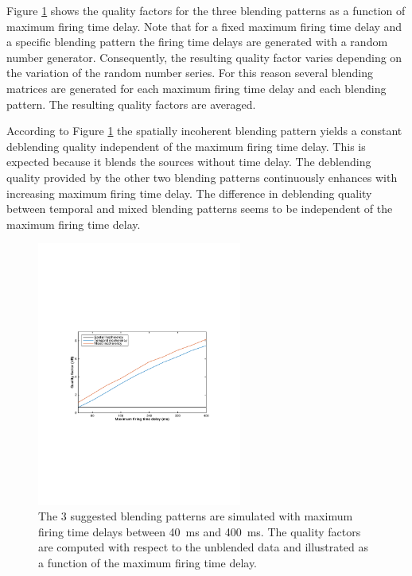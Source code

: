 Figure \ref{fig:Ch-Results-QualityFactors} shows the quality factors for the three blending patterns as a function of maximum firing time delay. Note that for a fixed maximum firing time delay and a specific blending pattern the firing time delays are generated with a random number generator. Consequently, the resulting quality factor varies depending on the variation of the random number series. For this reason several blending matrices are generated for each maximum firing time delay and each blending pattern. The resulting quality factors are averaged.

According to Figure \ref{fig:Ch-Results-QualityFactors} the spatially incoherent blending pattern yields a constant deblending quality independent of the maximum firing time delay. This is expected because it blends the sources without time delay. The deblending quality provided by the other two blending patterns continuously enhances with increasing maximum firing time delay. The difference in deblending quality between temporal and mixed blending patterns seems to be independent of the maximum firing time delay.

\begin{figure}
	\centering
	\includegraphics[width = 0.6\textwidth]{Plots/BlendingPatterns/quality_line_plot_avg}
	\caption{The 3 suggested blending patterns are simulated with maximum firing time delays between \SI{40}{\milli\second} and \SI{400}{\milli\second}. The quality factors are computed with respect to the unblended data and illustrated as a function of the maximum firing time delay.}
	\label{fig:Ch-Results-QualityFactors}
\end{figure}

